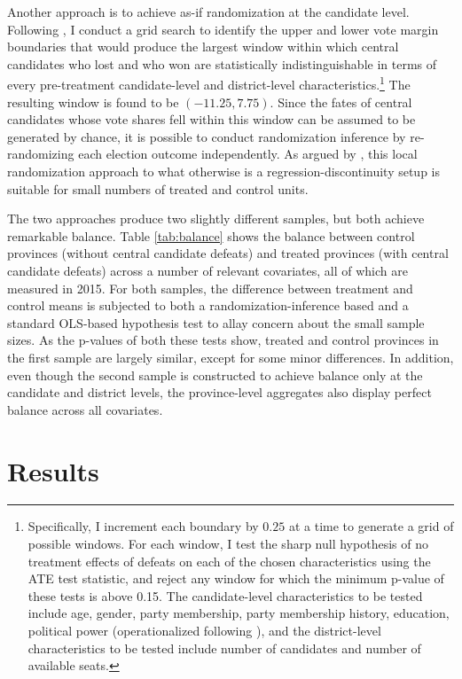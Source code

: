 \documentclass[12pt]{article}
\newcommand{\1}{\mathbbm{1}}
\begin{document}
Another approach is to achieve as-if randomization at the candidate level. Following \citet{CattaneoTitiunik2015}, I conduct a grid search to identify the upper and lower vote margin boundaries that would produce the largest window within which central candidates who lost and who won are statistically indistinguishable in terms of every pre-treatment candidate-level and district-level characteristics.\footnote{Specifically, I  increment each boundary by $0.25$ at a time to generate a grid of possible windows. For each window, I test the sharp null hypothesis of no treatment effects of defeats on each of the chosen characteristics using the ATE test statistic, and reject any window for which the minimum p-value of these tests is above 0.15. The candidate-level characteristics to be tested include age, gender, party membership, party membership history, education, political power (operationalized following \citet{MaleskySchuler2011}), and the district-level characteristics to be tested include number of candidates and number of available seats.} The resulting window is found to be $(-11.25, 7.75)$. Since the fates of central candidates whose vote shares fell within this window can be assumed to be generated by chance, it is possible to conduct randomization inference by re-randomizing each election outcome independently. As argued by \citet{CattaneoTitiunik2015}, this local randomization approach to what otherwise is a regression-discontinuity setup is suitable for small numbers of treated and control units.

The two approaches produce two slightly different samples, but both achieve remarkable balance. Table \ref{tab:balance} shows the balance between control provinces (without central candidate defeats) and treated provinces (with central candidate defeats) across a number of relevant covariates, all of which are measured in 2015. For both samples, the difference between treatment and control means is subjected to both a randomization-inference based and a standard OLS-based hypothesis test to allay concern about the small sample sizes. As the p-values of both these tests show, treated and control provinces in the first sample are largely similar, except for some minor differences. In addition, even though the second sample is constructed to achieve balance only at the candidate and district levels, the province-level aggregates also display perfect balance across all covariates.



\section{Results}
\label{sec:results}

\end{document}
